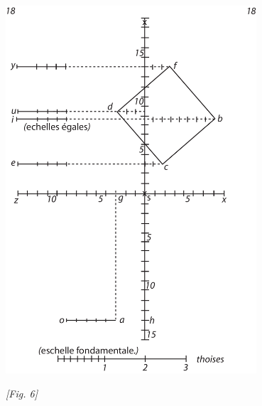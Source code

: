 \begin{center}
\includegraphics[width=0.7\textwidth]{images/T18-Desargues}
\\\rule[-4mm]{0mm}{10mm}\textit{[Fig. 6]}
\end{center}